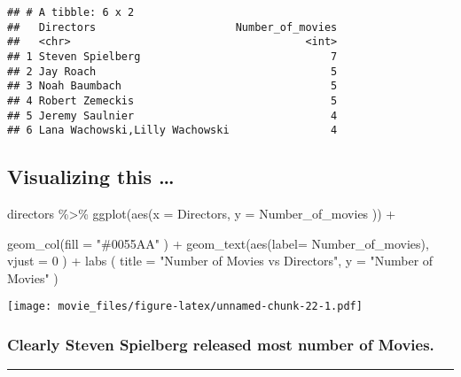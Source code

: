 \documentclass[
]{article}
\newenvironment{Shaded}{\begin{snugshade}}{\end{snugshade}}
\newcommand{\AttributeTok}[1]{\textcolor[rgb]{0.77,0.63,0.00}{#1}}
\newcommand{\DecValTok}[1]{\textcolor[rgb]{0.00,0.00,0.81}{#1}}
\newcommand{\FunctionTok}[1]{\textcolor[rgb]{0.00,0.00,0.00}{#1}}
\newcommand{\NormalTok}[1]{#1}
\newcommand{\SpecialCharTok}[1]{\textcolor[rgb]{0.00,0.00,0.00}{#1}}
\newcommand{\StringTok}[1]{\textcolor[rgb]{0.31,0.60,0.02}{#1}}
\begin{document}
\begin{verbatim}
## # A tibble: 6 x 2
##   Directors                      Number_of_movies
##   <chr>                                     <int>
## 1 Steven Spielberg                              7
## 2 Jay Roach                                     5
## 3 Noah Baumbach                                 5
## 4 Robert Zemeckis                               5
## 5 Jeremy Saulnier                               4
## 6 Lana Wachowski,Lilly Wachowski                4
\end{verbatim}

\hypertarget{visualizing-this-1}{%
\subsection{Visualizing this \ldots{}}\label{visualizing-this-1}}

\begin{Shaded}
\begin{Highlighting}[]
\NormalTok{directors }\SpecialCharTok{\%\textgreater{}\%}
  \FunctionTok{ggplot}\NormalTok{(}\FunctionTok{aes}\NormalTok{(}\AttributeTok{x =}\NormalTok{ Directors, }\AttributeTok{y =}\NormalTok{ Number\_of\_movies )) }\SpecialCharTok{+}
  
  \FunctionTok{geom\_col}\NormalTok{(}\AttributeTok{fill =} \StringTok{"\#0055AA"}\NormalTok{ ) }\SpecialCharTok{+}
    \FunctionTok{geom\_text}\NormalTok{(}\FunctionTok{aes}\NormalTok{(}\AttributeTok{label=}\NormalTok{ Number\_of\_movies), }\AttributeTok{vjust =} \DecValTok{0}\NormalTok{ ) }\SpecialCharTok{+}
  \FunctionTok{labs}\NormalTok{ (}
    \AttributeTok{title =} \StringTok{"Number of Movies vs Directors"}\NormalTok{,}
    \AttributeTok{y =} \StringTok{"Number of Movies"}
\NormalTok{  )}
\end{Highlighting}
\end{Shaded}

\texttt{[image: movie\_files/figure-latex/unnamed-chunk-22-1.pdf]}

\hypertarget{clearly-steven-spielberg-released-most-number-of-movies.}{%
\subsubsection{\texorpdfstring{\textbf{Clearly Steven Spielberg released
most number of
Movies.}}{Clearly Steven Spielberg released most number of Movies.}}\label{clearly-steven-spielberg-released-most-number-of-movies.}}

\begin{center}\rule{0.5\linewidth}{0.5pt}\end{center}
\end{document}
